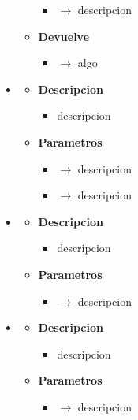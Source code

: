 \begin{itemize}
\begin{itemize}
\begin{itemize}
            \item {} $\rightarrow$ descripcion
		\end{itemize}
        \item \textbf{Devuelve}
		\begin{itemize}
			\item {} $\rightarrow$ algo
		\end{itemize}
	\end{itemize}
    \item{}
	\begin{itemize}
		\item \textbf{Descripcion}
        \begin{itemize}
			\item descripcion
		\end{itemize}
        \item \textbf{Parametros}
		\begin{itemize}
			\item {} $\rightarrow$ descripcion
            \item {} $\rightarrow$ descripcion
		\end{itemize}
	\end{itemize}
	\item{}
	\begin{itemize}
		\item \textbf{Descripcion}
        \begin{itemize}
			\item descripcion
		\end{itemize}
        \item \textbf{Parametros}
		\begin{itemize}
			\item {} $\rightarrow$ descripcion
		\end{itemize}
	\end{itemize}
    \item{}
	\begin{itemize}
		\item \textbf{Descripcion}
        \begin{itemize}
			\item descripcion
		\end{itemize}
        \item \textbf{Parametros}
		\begin{itemize}
			\item {} $\rightarrow$ descripcion

\end{itemize}
\end{itemize}
\end{itemize}
